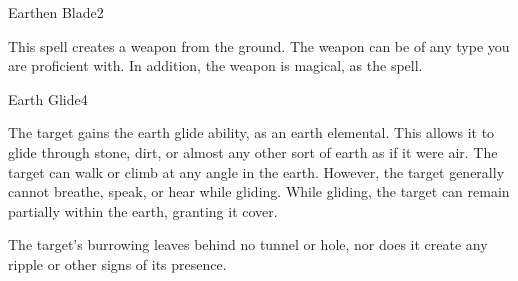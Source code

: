 \begin{spellsection}{Earthen Blade}{2}
    \begin{spellheader}
    \end{spellheader}
    \begin{spellcontent}
        \begin{spelltargetinginfo}
        \end{spelltargetinginfo}
        \begin{spelleffects}
            \spelleffect This spell creates a weapon from the ground. The weapon can be of any type you are proficient with. In addition, the weapon is magical, as the  spell.
            \spelldur \durlong \dismissable
        \end{spelleffects}
    \end{spellcontent}
    \begin{spellfooter}
        \miscastexplode
    \end{spellfooter}
\end{spellsection}

\begin{spellsection}{Earth Glide}{4}
    \begin{spellheader}
    \end{spellheader}
    \begin{spellcontent}
        \begin{spelltargetinginfo}
        \end{spelltargetinginfo}
        \begin{spelleffects}
            \spelleffect The target gains the earth glide ability, as an earth elemental. This allows it to glide through stone, dirt, or almost any other sort of earth as if it were air. The target can walk or climb at any angle in the earth. However, the target generally cannot breathe, speak, or hear while gliding. While gliding, the target can remain partially within the earth, granting it cover.
            \spelldur \durshort
        \end{spelleffects}
    \end{spellcontent}
    \begin{spellfooter}
        \spellnotes The target's burrowing leaves behind no tunnel or hole, nor does it create any ripple or other signs of its presence.
        \miscastexplode
    \end{spellfooter}
\end{spellsection}

